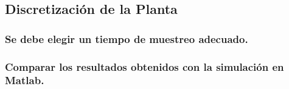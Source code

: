 \subsection{Discretización de la Planta}
\subsubsection{Se debe elegir un tiempo de muestreo adecuado.}
\subsubsection{Comparar los resultados obtenidos con la simulación en Matlab.}
